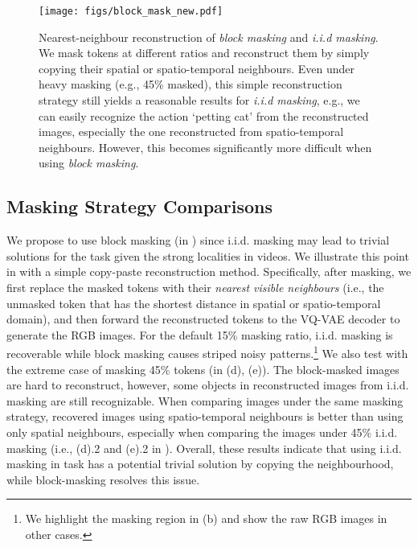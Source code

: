 \begin{figure}[t]
\vskip 0.1in
\begin{center}
\texttt{[image: figs/block\_mask\_new.pdf]}
                \vspace{-6pt}
\caption{
Nearest-neighbour reconstruction of  \textit{block masking} and \textit{i.i.d masking}.
We mask tokens at different ratios and reconstruct them by simply copying their spatial or spatio-temporal neighbours.
Even under heavy masking (e.g., 45\% masked), this simple reconstruction strategy still yields a reasonable results for \textit{i.i.d masking}, e.g., we can easily recognize the action `petting cat' from the reconstructed images, especially the one reconstructed from spatio-temporal neighbours. However, this becomes significantly more difficult when using \textit{block masking}.
}
\label{fig:block_vs_iid}
\end{center}
\vspace{-10pt}
\end{figure}



\subsection{Masking Strategy Comparisons} 
\label{sec:append_mask_visualization}
We propose to use block masking (in ) since i.i.d. masking  may lead to trivial solutions for the \ourmask task given the strong localities in videos.
We illustrate this point in  with a simple copy-paste reconstruction method. 
Specifically, after masking, we first replace the masked tokens with their \textit{nearest visible neighbours} (i.e., the unmasked token that has the shortest distance in spatial or spatio-temporal domain), and then forward the reconstructed tokens to the VQ-VAE decoder to generate the RGB images.
For the default 15\% masking ratio, i.i.d. masking is recoverable while block masking causes striped noisy patterns.\footnote{We highlight the masking region in (b) and show the raw RGB images in other cases.}
We also test with the extreme case of masking 45\% tokens (in  (d), (e)).
The block-masked images are hard to reconstruct, however, some objects in reconstructed images from i.i.d. masking are still recognizable.
When comparing images under the same masking strategy, recovered images using spatio-temporal neighbours is better than using only spatial neighbours, especially when comparing the images under 45\% i.i.d. masking (i.e., (d).2 and (e).2 in ).
Overall, these results indicate that using i.i.d. masking in \ourmask task has a potential trivial solution by copying the neighbourhood, while block-masking resolves this issue.




